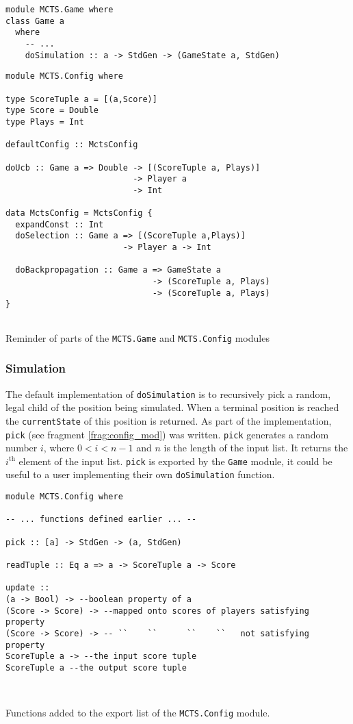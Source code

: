 \begin{fragment}
\begin{lstlisting}
module MCTS.Game where
class Game a 
  where
    -- ...
    doSimulation :: a -> StdGen -> (GameState a, StdGen)
\end{lstlisting}
\begin{lstlisting}
module MCTS.Config where

type ScoreTuple a = [(a,Score)]
type Score = Double
type Plays = Int

defaultConfig :: MctsConfig

doUcb :: Game a => Double -> [(ScoreTuple a, Plays)]
                          -> Player a 
                          -> Int
                          
data MctsConfig = MctsConfig {  
  expandConst :: Int
  doSelection :: Game a => [(ScoreTuple a,Plays)] 
                        -> Player a -> Int
  
  doBackpropagation :: Game a => GameState a
                              -> (ScoreTuple a, Plays)
                              -> (ScoreTuple a, Plays)
}


\end{lstlisting}
\caption{\label{frag:reminder} Reminder of parts of the \texttt{MCTS.Game} and \texttt{MCTS.Config} modules}
\end{fragment}

\subsubsection{Simulation}
The default implementation of \verb|doSimulation| is to recursively pick a random, legal child of the position being simulated. When a terminal position is reached the \texttt{currentState} of this position is returned. As part of the implementation, \texttt{pick} (see fragment \ref{frag:config_mod}) was written. \texttt{pick} generates a random number $i$, where $0<i<n-1$ and $n$ is the length of the input list. It returns the $i^{\text{th}}$ element of the input list. \texttt{pick} is exported by the \texttt{Game} module, it could be useful to a user implementing their own \texttt{doSimulation} function.

\begin{fragment}
\begin{lstlisting}     
module MCTS.Config where                    

-- ... functions defined earlier ... --

pick :: [a] -> StdGen -> (a, StdGen)

readTuple :: Eq a => a -> ScoreTuple a -> Score

update :: 
(a -> Bool) -> --boolean property of a
(Score -> Score) -> --mapped onto scores of players satisfying property
(Score -> Score) -> -- ``    ``      ``    ``   not satisfying property
ScoreTuple a -> --the input score tuple
ScoreTuple a --the output score tuple



\end{lstlisting}
\caption{\label{frag:config_mod}Functions added to the export list of the \texttt{MCTS.Config} module.}
\end{fragment}

